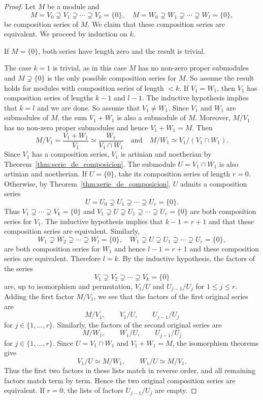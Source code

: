\begin{proof}
    Let $M$ be a module and
    \[
		M=V_0\supsetneq V_1\supsetneq\cdots\supsetneq V_k=\{0\},
		\quad
		M=W_0\supsetneq W_1\supsetneq\cdots\supsetneq W_l=\{0\},
	\]
	be composition series of $M$. 
	We claim that these composition series are equivalent. 
	We proceed by induction on $k$. 
	
	If $M=\{0\}$, both series have length zero and the result is trivial. 

	The case $k=1$ is trivial, as 
	in this case $M$ has no non-zero proper submodules and $M\supsetneq\{0\}$ 
	is the only possible composition series for $M$. So
	assume the result holds for modules with composition series of length $<k$. If $V_1=W_1$, then 
	$V_1$ has composition series of lengths $k-1$ and $l-1$. The inductive hypothesis implies that 
	$k=l$ and we are done. So assume that $V_1\ne W_1$. Since $V_1$ and $W_1$ are submodules of $M$, the
	sum $V_1+W_1$ is also a submodule of $M$. Moreover, $M/V_1$ has no non-zero proper submodules
	and hence 
	$V_1+W_1=M$. Then 
	\[
		M/V_1=\frac{V_1+W_1}{V_1}\simeq\frac{W_1}{V_1\cap W_1}
	\quad\text{and}\quad 
	M/W_1\simeq V_1/(V_1\cap W_1).
	\]  
	Since $V_1$ has a composition series, $V_1$ is artinian and
	noetherian by Theorem~\ref{thm:serie_de_composicion}. The submodule $U=V_1\cap W_1$ is also 
	artinian and noetherian. 
	If $U=\{0\}$, take its composition series of length $r=0$.
	Otherwise, by Theorem~\ref{thm:serie_de_composicion}, 
	$U$ admits a composition series 
	\[
		U=U_0\supsetneq U_1\supsetneq\cdots\supsetneq U_r=\{0\}.
	\]
    Thus
    $V_1\supsetneq\cdots\supsetneq V_k=\{0\}$ and  
	$V_1\supsetneq U\supsetneq U_1\supsetneq\cdots\supsetneq U_r=\{0\}$ are both composition 
	series for $V_1$. The inductive hypothesis implies that 
	$k-1=r+1$ and that these composition series are equivalent. Similarly, 
	\[
		W_1\supsetneq W_2\supsetneq\cdots\supsetneq W_l=\{0\},
		\quad
		W_1\supsetneq U\supsetneq U_1\supsetneq\cdots\supsetneq U_{r}=\{0\},
	\]
    are both composition series for $W_1$ and hence $l-1=r+1$ and these composition 
    series are equivalent. 
	Therefore $l=k$. By the inductive hypothesis, the factors of
the series
\[
V_1\supsetneq V_2\supsetneq\cdots\supsetneq V_k=\{0\}
\]
are, up to isomorphism and permutation, $V_1/U$ and
$U_{j-1}/U_j$ for $1\leq j\leq r$. Adding the first factor
$M/V_1$, we see that the factors of the first original series are
\[
M/V_1,\qquad V_1/U,\qquad U_{j-1}/U_j
\]
for $j\in\{1,\dots,r\}$. 
Similarly, the factors of the second original series are
\[
M/W_1,\qquad W_1/U,\qquad U_{j-1}/U_j
\]
for $j\in\{1,\dots,r\}$. 
Since $U=V_1\cap W_1$ and $V_1+W_1=M$, the isomorphism
theorems give
\[
V_1/U\simeq M/W_1,
\qquad
W_1/U\simeq M/V_1.
\]
Thus the first two factors in these lists match in reverse order,
and all remaining factors match term by term.
Hence the two original composition series are equivalent.
If $r=0$, the lists of factors $U_{j-1}/U_j$ are empty.
\end{proof}

